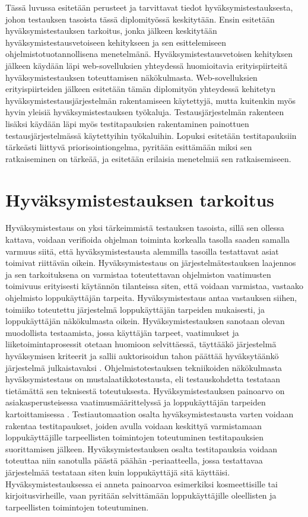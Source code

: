 Tässä luvussa esitetään perusteet ja tarvittavat tiedot hyväksymistestauksesta, johon testauksen tasoista tässä diplomityössä keskitytään.
Ensin esitetään hyväksymistestauksen tarkoitus, jonka jälkeen keskitytään hyväksymistestausvetoiseen kehitykseen ja sen esittelemiseen ohjelmistotuotannollisena menetelmänä.
Hyväksymistestausvetoisen kehityksen jälkeen käydään läpi web-sovelluksien yhteydessä huomioitavia erityispiirteitä hyväksymistestauksen toteuttamisen näkökulmasta.
Web-sovelluksien erityispiirteiden jälkeen esitetään tämän diplomityön yhteydessä kehitetyn hyväksymistestausjärjestelmän rakentamiseen käytettyjä, mutta kuitenkin myös hyvin yleisiä hyväksymistestauksen työkaluja.
Testausjärjestelmän rakenteen lisäksi käydään läpi myös testitapauksien rakentaminen painottuen testausjärjestelmässä käytettyihin työkaluihin.
Lopuksi esitetään testitapauksiin tärkeästi liittyvä priorisointiongelma, pyritään esittämään miksi sen ratkaiseminen on tärkeää, ja esitetään erilaisia menetelmiä sen ratkaisemiseen.

\section{Hyväksymistestauksen tarkoitus} \label{ch:08_hyvaksymistestauksen_tarkoitus}

  Hyväksymistestaus on yksi tärkeimmistä testauksen tasoista, sillä sen ollessa kattava, voidaan verifioida ohjelman toiminta korkealla tasolla saaden samalla varmuus siitä, että hyväksymistestausta alemmilla tasoilla testattavat asiat toimivat riittävän oikein.
  Hyväksymistestaus on järjestelmätestauksen laajennos \cite[s.~373]{software_testing_book} ja sen tarkoituksena on varmistaa toteutettavan ohjelmiston vaatimusten toimivuus erityisesti käytännön tilanteissa siten, että voidaan varmistaa, vastaako ohjelmisto loppukäyttäjän tarpeita.
  Hyväksymistestaus antaa vastauksen siihen, toimiiko toteutettu järjestelmä loppukäyttäjän tarpeiden mukaisesti, ja loppukäyttäjän näkökulmasta oikein.
  Hyväksymistestauksen sanotaan olevan muodollista testaamista, jossa käyttäjän tarpeet, vaatimukset ja liiketoimintaprosessit otetaan huomioon selvittäessä, täyttääkö järjestelmä hyväksymisen kriteerit ja sallii auktorisoidun tahon päättää hyväksytäänkö järjestelmä julkaistavaksi \cite{istqb_glossary_v3_2}.
  Ohjelmistotestauksen tekniikoiden näkökulmasta hyväksymistestaus on mustalaatikkotestausta, eli testauskohdetta testataan tietämättä sen teknisestä toteutuksesta.
  Hyväksymistestauksen painoarvo on asiakasperusteisessa vaatimusmäärittelyssä ja loppukäyttäjän tarpeiden kartoittamisessa \cite[s.~104]{the_art_of_software_testing_book}.
  Testiautomaation osalta hyväksymistestausta varten voidaan rakentaa testitapaukset, joiden avulla voidaan keskittyä varmistamaan loppukäyttäjille tarpeellisten toimintojen toteutuminen testitapauksien suorittamisen jälkeen.
  Hyväksymistestauksen osalta testitapauksia voidaan toteuttaa niin sanotulla päästä päähän -periaatteella, jossa testattavaa järjestelmää testataan siten kuin loppukäyttäjä sitä käyttäisi.
  Hyväksymistestauksessa ei anneta painoarvoa esimerkiksi kosmeettisille tai kirjoitusvirheille, vaan pyritään selvittämään loppukäyttäjille oleellisten ja tarpeellisten toimintojen toteutuminen.

